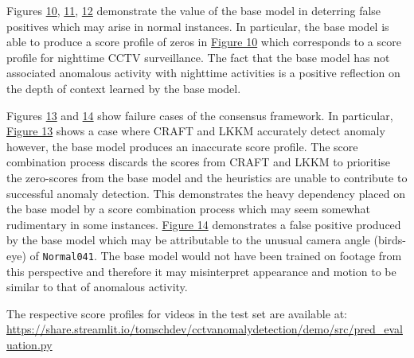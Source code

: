 \documentclass[sigplan,authorversion,nonacm, 9pt]{acmart}
\begin{document}
Figures \hyperref[fig:normal010]{10}, \hyperref[fig:normal019]{11}, \hyperref[fig:normal006]{12} demonstrate the value of the base model in deterring false positives which may arise in normal instances. In particular, the base model is able to produce a score profile of zeros in \hyperref[fig:normal010]{Figure 10} which corresponds to a score profile for nighttime CCTV surveillance. The fact that the base model has not associated anomalous activity with nighttime activities is a positive reflection on the depth of context learned by the base model.   
\par
Figures \hyperref[fig:failshooting022]{13} and \hyperref[fig:failnormal041]{14} show failure cases of the consensus framework. In particular, \hyperref[fig:failshooting022]{Figure 13} shows a case where CRAFT and LKKM accurately detect anomaly however, the base model produces an inaccurate score profile. The score combination process discards the scores from CRAFT and LKKM to prioritise the zero-scores from the base model and the heuristics are unable to contribute to successful anomaly detection. This demonstrates the heavy dependency placed on the base model by a score combination process which may seem somewhat rudimentary in some instances. \hyperref[fig:failnormal041]{Figure 14} demonstrates a false positive produced by the base model which may be attributable to the unusual camera angle (birds-eye) of \texttt{Normal041}. The base model would not have been trained on footage from this perspective and therefore it may misinterpret appearance and motion to be similar to that of anomalous activity.
\par
The respective score profiles for videos in the test set are available at: \url{https://share.streamlit.io/tomschdev/cctvanomalydetection/demo/src/pred_evaluation.py}


\end{document}
